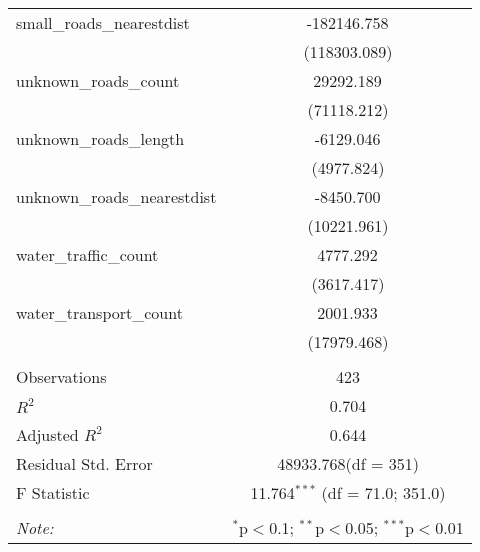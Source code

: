 \begin{table}[!htbp]
\begin{tabular}{@{\extracolsep{5pt}}lc}
 small_roads_nearestdist & -182146.758$^{}$ \\
  & (118303.089) \\
 unknown_roads_count & 29292.189$^{}$ \\
  & (71118.212) \\
 unknown_roads_length & -6129.046$^{}$ \\
  & (4977.824) \\
 unknown_roads_nearestdist & -8450.700$^{}$ \\
  & (10221.961) \\
 water_traffic_count & 4777.292$^{}$ \\
  & (3617.417) \\
 water_transport_count & 2001.933$^{}$ \\
  & (17979.468) \\
\hline \\[-1.8ex]
 Observations & 423 \\
 $R^2$ & 0.704 \\
 Adjusted $R^2$ & 0.644 \\
 Residual Std. Error & 48933.768(df = 351)  \\
 F Statistic & 11.764$^{***}$ (df = 71.0; 351.0) \\
\hline
\hline \\[-1.8ex]
\textit{Note:} & \multicolumn{1}{r}{$^{*}$p$<$0.1; $^{**}$p$<$0.05; $^{***}$p$<$0.01} \\
\end{tabular}
\end{table}